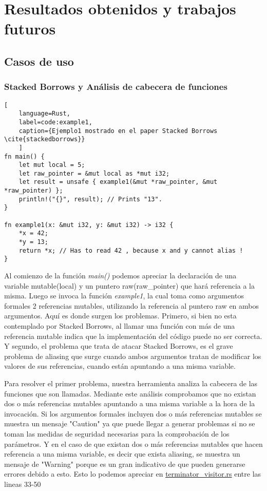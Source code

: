 \chapter{Resultados obtenidos y trabajos futuros}
\section{Casos de uso}
\subsection{Stacked Borrows y Análisis de cabecera de funciones}

\begin{lstlisting}[
    language=Rust,
    label=code:example1,
    caption={Ejemplo1 mostrado en el paper Stacked Borrows \cite{stackedborrows}}
    ]
fn main() {
    let mut local = 5;
    let raw_pointer = &mut local as *mut i32;
    let result = unsafe { example1(&mut *raw_pointer, &mut *raw_pointer) };
    println!("{}", result); // Prints "13".
}

fn example1(x: &mut i32, y: &mut i32) -> i32 {
    *x = 42;
    *y = 13;
    return *x; // Has to read 42 , because x and y cannot alias !
}
\end{lstlisting}

Al comienzo de la función \textit{main()} podemos apreciar la declaración de una variable mutable(local) y un puntero raw(raw\_pointer)
que hará referencia a la misma. Luego se invoca la función \textit{example1}, la cual toma como argumentos formales 2 referencias mutables,
utilizando la referencia al puntero raw en ambos argumentos. Aquí es donde surgen los problemas. Primero, si bien no esta contemplado por
Stacked Borrows, al llamar una función con más de una referencia mutable indica que la implementación del código puede no ser correcta.
Y segundo, el problema que trata de atacar Stacked Borrows, es el grave problema de aliasing que surge cuando ambos argumentos tratan de
modificar los valores de sus referencias, cuando están apuntando a una misma variable.

Para resolver el primer problema, nuestra herramienta analiza la cabecera de las funciones que son llamadas. Mediante este análisis comprobamos que
no existan dos o más referencias mutables apuntando a una misma variable a la hora de la invocación. Si los argumentos formales incluyen dos o más
referencias mutables se muestra un mensaje "Caution" ya que puede llegar a generar problemas si no se toman las medidas de seguridad necesarias
para la comprobación de los parámetros. Y en el caso de que existan dos o más referencias mutables que hacen referencia a una misma variable, es decir
que exista aliasing, se muestra un mensaje de "Warning" porque es un gran indicativo de que pueden generarse errores debido a esto.
Esto lo podemos apreciar en \href{run:../src/mir_visitor/terminator_visitor.rs}{terminator\_visitor.rs} entre las lineas 33-50

